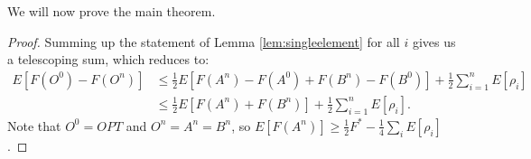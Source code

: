 \begin{comment}

(\xinghao{Note} If we weaken the assumption of $\Delta_+(i) \leq \Delta_+^{\max}(i)$ to $\Delta_+(i) \leq \Delta_+^{\max}(i) + \epsilon_i$, then in Case 6 above, we can instead bound
\begin{align*}
E[F(O^{i-1})-F(O^i)|A^{i-1}, j]
&\leq \frac{\Delta_+^{\max}(i) \Delta_-^{\max}(i) + \epsilon\max(\Delta_+^{\max}(i), \Delta_-^{\max})}{\Delta_+^{\max}(i) + \Delta_-^{\max}(i)}\\
&\leq \frac{\Delta_+^{\max}(i) \Delta_-^{\max}(i) + \epsilon(\Delta_+^{\max}(i) + \Delta_-^{\max})}{\Delta_+^{\max}(i) + \Delta_-^{\max}(i)}.
\end{align*}
The bound of Lemma \ref{lem:singleelement} becomes
\[E[F(O^{i-1})-F(O^i)] \leq \frac{1}{2} E[F(A^i) - F(A^{i-1}) + F(B^i) - F(B^{i-1}) + \rho_i + 2\epsilon_i],\]
and the bound of Theorem \ref{thm:randomapprox} becomes $E[F(A)] \geq \frac{1}{2} F^* - \frac{1}{4}\sum_iE[\rho_i + 2\epsilon_i]$.
)

\end{comment}







We will now prove the main theorem.

\thmrandomapprox*

\begin{proof}
Summing up the statement of Lemma \ref{lem:singleelement} for all $i$ gives us a telescoping sum, which reduces to:
\begin{align*}
E[F(O^0)-F(O^n)]
&\leq \frac{1}{2} E[F(A^n) - F(A^0) + F(B^n) - F(B^0)] + \frac{1}{2}\sum_{i=1}^nE[\rho_i]\\
&\leq \frac{1}{2} E[F(A^n) + F(B^n)] + \frac{1}{2}\sum_{i=1}^nE[\rho_i].
\end{align*}
Note that $O^0 = OPT$ and $O^n = A^n = B^n$, so $E[F(A^n)] \geq \frac{1}{2} F^* - \frac{1}{4}\sum_iE[\rho_i]$.
\end{proof}









